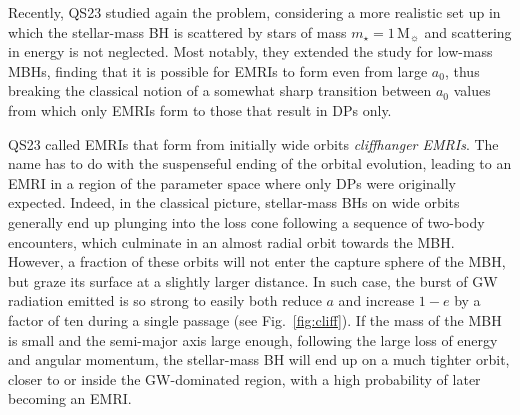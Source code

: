 \documentclass[desactivate]{aa}
\begin{document}
        Recently, QS23 studied again the problem, considering a more realistic set up in which the stellar-mass BH is scattered by stars of mass $m_\star = 1\, \mathrm{M_\sun}$ and scattering in energy is not neglected. Most notably, they extended the study for low-mass MBHs, finding that it is possible for EMRIs to form even from large $a_0$, thus breaking the classical notion of a somewhat sharp transition between $a_0$ values from which only EMRIs form to those that result in DPs only.

        QS23 called EMRIs that form from initially wide orbits \textit{cliffhanger EMRIs}. The name has to do with the suspenseful ending of the orbital evolution, leading to an EMRI in a region of the parameter space where only DPs were originally expected. Indeed, in the classical picture, stellar-mass BHs on wide orbits generally end up plunging into the loss cone following a sequence of two-body encounters, which culminate in an almost radial orbit towards the MBH. However, a fraction of these orbits will not enter the capture sphere of the MBH, but graze its surface at a slightly larger distance. In such case, the burst of GW radiation emitted is so strong to easily both reduce $a$ and increase $1-e$ by a factor of ten during a single passage (see Fig.\ \ref{fig:cliff}). If the mass of the MBH is small and the semi-major axis large enough, following the large loss of energy and angular momentum, the stellar-mass BH will end up on a much tighter orbit, closer to or inside the GW-dominated region, with a high probability of later becoming an EMRI. 
\end{document}
